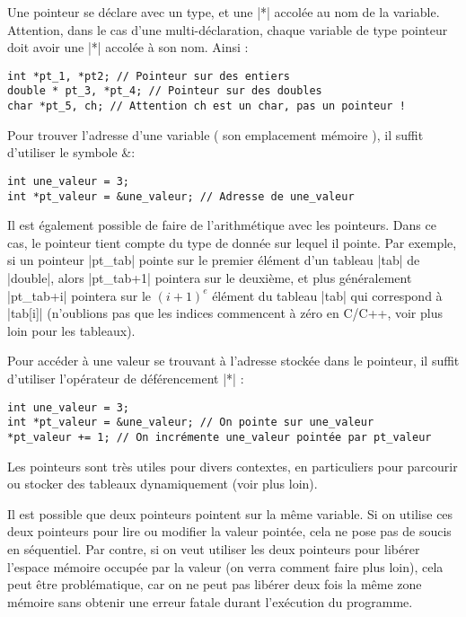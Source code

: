 Une pointeur se déclare avec un type, et une |*| accolée au nom de la variable. Attention, dans le cas d'une multi-déclaration, chaque variable de type pointeur doit avoir une |*| accolée à son nom. Ainsi :
\begin{lstlisting}[caption=Déclaration de pointeurs]
int *pt_1, *pt2; // Pointeur sur des entiers
double * pt_3, *pt_4; // Pointeur sur des doubles
char *pt_5, ch; // Attention ch est un char, pas un pointeur !
\end{lstlisting}

Pour trouver l'adresse d'une variable ( son emplacement mémoire ), il suffit d'utiliser le symbole \verb@&\verb@ :

\begin{lstlisting}
int une_valeur = 3;
int *pt_valeur = &une_valeur; // Adresse de une_valeur
\end{lstlisting}

Il est également possible de faire de l'arithmétique avec les pointeurs. Dans ce cas, le pointeur tient compte du type de donnée sur lequel il pointe. Par exemple, si un pointeur |pt_tab| pointe  sur le premier élément d'un tableau |tab| de |double|, alors |pt_tab+1| pointera sur le deuxième, et plus généralement |pt_tab+i| pointera sur le $(i+1)^{e}$ élément du tableau |tab| qui correspond à
|tab[i]| (n'oublions pas que les indices commencent à zéro en C/C++, voir plus loin pour les tableaux).

Pour accéder à une valeur se trouvant à l'adresse stockée dans le pointeur, il suffit d'utiliser l'opérateur de déférencement |*| :
\begin{lstlisting}[caption=Exemple d'utilisation du déférencement]
int une_valeur = 3;
int *pt_valeur = &une_valeur; // On pointe sur une_valeur
*pt_valeur += 1; // On incrémente une_valeur pointée par pt_valeur
\end{lstlisting}

Les pointeurs sont très utiles pour divers contextes, en particuliers pour parcourir ou stocker des tableaux dynamiquement (voir plus loin).

Il est possible que deux pointeurs pointent sur la même variable. Si on utilise ces deux pointeurs pour lire ou modifier la valeur pointée, cela ne pose pas de soucis en séquentiel. Par contre, si on veut utiliser les deux pointeurs pour libérer l'espace mémoire occupée par la valeur (on verra comment faire plus loin), cela peut être problématique, car on ne peut pas libérer deux fois la même zone mémoire sans obtenir une erreur fatale durant l'exécution du programme.

